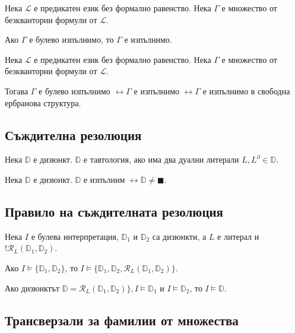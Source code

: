 \documentclass{article}
\begin{document}
\begin{claim}
Нека $\mathcal{L}$ е предикатен език без формално равенство. Нека $\Gamma$ е множество от безкванторни формули от $\mathcal{L}$.

Ако $\Gamma$ е булево изпълнимо, то $\Gamma$ е изпълнимо.
\end{claim}

\begin{claim}
Нека $\mathcal{L}$ е предикатен език без формално равенство. Нека $\Gamma$ е множество от безкванторни формули от $\mathcal{L}$.

Тогава $\Gamma$ е булево изпълнимо $\longleftrightarrow \Gamma$ е изпълнимо $\longleftrightarrow \Gamma$ е изпълнимо в свободна ербранова структура.
\end{claim}

\subsection*{Съждителна резолюция}
\begin{claim}
Нека $\mathbb{D}$ е дизюнкт. $\mathbb{D}$ е тавтология, ако има два дуални литерали $L, L^\partial \in \mathbb{D}$.
\end{claim}

\begin{claim}
Нека $\mathbb{D}$ е дизюнкт. $\mathbb{D}$ е изпълним $\longleftrightarrow \mathbb{D} \neq \blacksquare$.
\end{claim}

\subsection*{Правило на съждителната резолюция}

\begin{claim}
Нека $I$ е булева интерпретация, $\mathbb{D}_1$ и $\mathbb{D}_2$ са дизюнкти, а $L$ е литерал и $!\mathcal{R}_L(\mathbb{D}_1, \mathbb{D}_2)$.

Ако $I \models \{\mathbb{D}_1, \mathbb{D}_2\}$, то $I \models \{\mathbb{D}_1, \mathbb{D}_2, \mathcal{R}_L(\mathbb{D}_1, \mathbb{D}_2)\}$.
\end{claim}

\begin{claim}
Ако дизюнктът $\mathbb{D} =  \mathcal{R}_L(\mathbb{D}_1, \mathbb{D}_2)\}, I \models \mathbb{D}_1$ и $I \models \mathbb{D}_2$, то $I \models \mathbb{D}$.
\end{claim}


\subsection*{Трансверзали за фамилии от множества}
\end{document}
